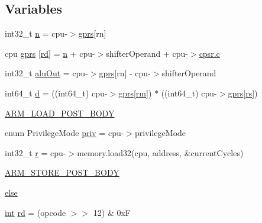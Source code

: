 \subsection*{Variables}
\begin{DoxyCompactItemize}
\item 
int32\+\_\+t \mbox{\hyperlink{isa-arm_8c_a4e34aefb3cc5403a07c020131077100a}{n}} = cpu-\/$>$\mbox{\hyperlink{isa-thumb_8c_a6b4b7e13a9a144391615b217c5917bc7}{gprs}}\mbox{[}rn\mbox{]}
\item 
cpu \mbox{\hyperlink{isa-arm_8c_a846d9bd9cdde9b5b8a4ca76a4f6f50bc}{gprs}} \mbox{[}\mbox{\hyperlink{isa-arm_8c_a555541ce18ed9b5fad657a06b22cb465}{rd}}\mbox{]} = \mbox{\hyperlink{isa-lr35902_8c_ae54e54065504090672c92ef62a1c5f05}{n}} + cpu-\/$>$shifter\+Operand + cpu-\/$>$\mbox{\hyperlink{isa-lr35902_8c_ab27f9f98dd173bfc694f5d161e839d6e}{cpsr.\+c}}
\item 
int32\+\_\+t \mbox{\hyperlink{isa-arm_8c_abb37005c27e4a13f1e19fb44cb8288cb}{alu\+Out}} = cpu-\/$>$\mbox{\hyperlink{isa-thumb_8c_a6b4b7e13a9a144391615b217c5917bc7}{gprs}}\mbox{[}rn\mbox{]} -\/ cpu-\/$>$shifter\+Operand
\item 
int64\+\_\+t \mbox{\hyperlink{isa-arm_8c_af25cf54a35472b6bdc2836d8e8ef4c6a}{d}} = ((int64\+\_\+t) cpu-\/$>$\mbox{\hyperlink{isa-thumb_8c_a6b4b7e13a9a144391615b217c5917bc7}{gprs}}\mbox{[}\mbox{\hyperlink{isa-thumb_8c_a20e40d2fb8c51fa4dd2b4449ad32e111}{rm}}\mbox{]}) $\ast$ ((int64\+\_\+t) cpu-\/$>$\mbox{\hyperlink{isa-thumb_8c_a6b4b7e13a9a144391615b217c5917bc7}{gprs}}\mbox{[}\mbox{\hyperlink{isa-thumb_8c_a03b78d51ad860bbea2f9c98276d0b70b}{rs}}\mbox{]})
\item 
\mbox{\hyperlink{isa-arm_8c_a4131d10dd974fc82650f1680b46fec77}{A\+R\+M\+\_\+\+L\+O\+A\+D\+\_\+\+P\+O\+S\+T\+\_\+\+B\+O\+DY}}
\item 
enum Privilege\+Mode \mbox{\hyperlink{isa-arm_8c_a0aeea5daab02e6ee74a9948da77a56e5}{priv}} = cpu-\/$>$privilege\+Mode
\item 
int32\+\_\+t \mbox{\hyperlink{isa-arm_8c_ad0156306be8fa0a12414e0da384f986a}{r}} = cpu-\/$>$memory.\+load32(cpu, address, \&current\+Cycles)
\item 
\mbox{\hyperlink{isa-arm_8c_ad6ad70baff6f5aa9c5f45e0a59623592}{A\+R\+M\+\_\+\+S\+T\+O\+R\+E\+\_\+\+P\+O\+S\+T\+\_\+\+B\+O\+DY}}
\item 
\mbox{\hyperlink{isa-arm_8c_a0544c3fe466e421738dae463968b70ba}{else}}
\item 
\mbox{\hyperlink{ioapi_8h_a787fa3cf048117ba7123753c1e74fcd6}{int}} \mbox{\hyperlink{isa-arm_8c_a555541ce18ed9b5fad657a06b22cb465}{rd}} = (opcode $>$$>$ 12) \& 0xF
$$
\end{DoxyCompactItemize}
